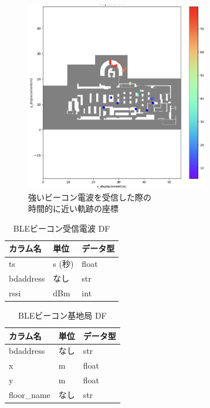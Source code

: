 \begin{figure}[ht]
	\centering
	\includegraphics[width=80mm]{image/ble-merge.jpg}
	\caption{強いビーコン電波を受信した際の\\時間的に近い軌跡の座標}    \label{fig:ble-merge}
\end{figure}

\begin{table}[ht]
	\centering
	\begin{tabular}{lll}
		\toprule
		カラム名      & 単位    & データ型  \\
		\midrule
		ts        & s (秒) & float \\
		bdaddress & なし    & str   \\
		rssi      & dBm   & int   \\
		\bottomrule
	\end{tabular}
	\caption{BLEビーコン受信電波 DF}
\end{table}

\begin{table}[ht]
	\centering
	\begin{tabular}{lll}
		\toprule
		カラム名        & 単位 & データ型  \\
		\midrule
		bdaddress   & なし & str   \\
		x           & m  & float \\
		y           & m  & float \\
		floor\_name & なし & str   \\
		\bottomrule
	\end{tabular}
	\caption{BLEビーコン基地局 DF}
\end{table}
